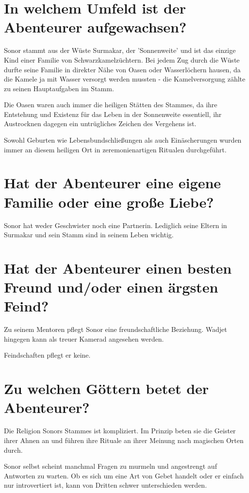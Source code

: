 	\section[Soziales Umfeld]{In welchem Umfeld ist der Abenteurer aufgewachsen?}
	
	Sonor stammt aus der Wüste Surmakar, der 'Sonnenweite' und ist das
	einzige Kind einer Familie von Schwarzkamelzüchtern. Bei jedem Zug durch
	die Wüste durfte seine Familie in direkter Nähe von Oasen oder
	Wasserlöchern hausen, da die Kamele ja mit Wasser versorgt werden
	mussten - die Kamelversorgung zählte zu seinen Hauptaufgaben im Stamm.

	Die Oasen waren auch immer die heiligen Stätten des Stammes, da ihre
	Entstehung und Existenz für das Leben in der Sonnenweite essentiell,
	ihr Austrocknen dagegen ein untrügliches Zeichen des Vergehens ist.
	
	Sowohl Geburten wie Lebensbundschließungen als auch Einäscherungen wurden immer
	an diesem heiligen Ort in zeremonienartigen Ritualen durchgeführt.


	\section[Beziehungsstatus]{Hat der Abenteurer eine eigene Familie oder eine große Liebe?}

	Sonor hat weder Geschwister noch eine Partnerin. Lediglich seine Eltern
	in Surmakar und sein Stamm sind in seinem Leben wichtig.


	\section[Freund und Feind]{Hat der Abenteurer einen besten Freund und/oder einen ärgsten Feind?}

	Zu seinem Mentoren pflegt Sonor eine freundschaftliche Beziehung.
	Wadjet hingegen kann als treuer Kamerad angesehen werden.
	
	Feindschaften pflegt er keine. 


	\section[Religion]{Zu welchen Göttern betet der Abenteurer?}
	
	Die Religion Sonors Stammes ist kompliziert. Im Prinzip beten sie die
	Geister ihrer Ahnen an und führen ihre Rituale an ihrer Meinung nach magischen
	Orten durch.

	Sonor selbst scheint manchmal Fragen zu murmeln und angestrengt auf
	Antworten zu warten. Ob es sich um eine Art von Gebet handelt oder er einfach nur
	introvertiert ist, kann von Dritten schwer unterschieden werden.


